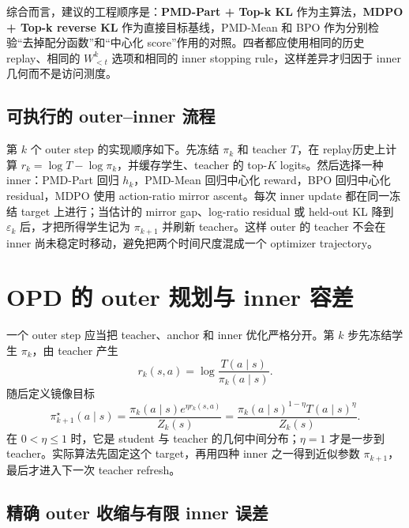 综合而言，建议的工程顺序是：\textbf{PMD-Part + Top-k KL} 作为主算法，\textbf{MDPO + Top-k reverse KL} 作为直接目标基线，PMD-Mean 和 BPO 作为分别检验“去掉配分函数”和“中心化 score”作用的对照。四者都应使用相同的历史replay、相同的 $W^k_{<t}$ 选项和相同的 inner stopping rule，这样差异才归因于 inner 几何而不是访问测度。

\subsection{可执行的 outer--inner 流程}
\label{subsec:outer-inner-algorithm}

第 $k$ 个 outer step 的实现顺序如下。先冻结 $\pi_k$ 和 teacher $T$，在 replay历史上计算 $r_k=\log T-\log\pi_k$，并缓存学生、teacher 的 top-$K$ logits。然后选择一种 inner：PMD-Part 回归 $h_k$，PMD-Mean 回归中心化 reward，BPO 回归中心化 residual，MDPO 使用 action-ratio mirror ascent。每次 inner update 都在同一冻结 target 上进行；当估计的 mirror gap、log-ratio residual 或 held-out KL 降到 $\varepsilon_k$ 后，才把所得学生记为 $\pi_{k+1}$ 并刷新 teacher。这样 outer 的 teacher 不会在 inner 尚未稳定时移动，避免把两个时间尺度混成一个 optimizer trajectory。

\section{OPD 的 outer 规划与 inner 容差}
\label{sec:ch2-outer-plan}

一个 outer step 应当把 teacher、anchor 和 inner 优化严格分开。第 $k$ 步先冻结学生 $\pi_k$，由 teacher 产生
\[
 r_k(s,a)=\log\frac{T(a\mid s)}{\pi_k(a\mid s)}.
\]
随后定义镜像目标
\[
 \pi_{k+1}^{\star}(a\mid s)
 =\frac{\pi_k(a\mid s)e^{\eta r_k(s,a)}}{Z_k(s)}
 =\frac{\pi_k(a\mid s)^{1-\eta}T(a\mid s)^\eta}{Z_k(s)}.
\]
在 $0<\eta\leq1$ 时，它是 student 与 teacher 的几何中间分布；$\eta=1$ 才是一步到 teacher。实际算法先固定这个 target，再用四种 inner 之一得到近似参数 $\pi_{k+1}$，最后才进入下一次 teacher refresh。

\subsection{精确 outer 收缩与有限 inner 误差}
\label{subsec:outer-contraction-inner-error}

